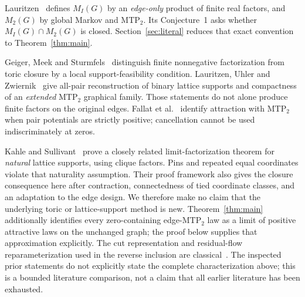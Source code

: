 \documentclass[11pt]{article}
\begin{document}
Lauritzen~\cite[pp.~3125--3126]{Lauritzen2022} defines $M_I(G)$ by an \emph{edge-only} product of finite real factors, and $M_2(G)$ by global Markov and MTP$_2$. Its Conjecture~1 asks whether $M_I(G)\cap M_2(G)$ is closed. Section~\ref{sec:literal} reduces that exact convention to Theorem~\ref{thm:main}.

Geiger, Meek and Sturmfels~\cite[Theorems~3.1--3.2]{GMS2006} distinguish finite nonnegative factorization from toric closure by a local support-feasibility condition. Lauritzen, Uhler and Zwiernik~\cite[Lemma~4.9 and Section~4.4]{LUZ2021} give all-pair reconstruction of binary lattice supports and compactness of an \emph{extended} MTP$_2$ graphical family. Those statements do not alone produce finite factors on the original edges. Fallat et al.~\cite[Theorem~7.5]{Fallat2017} identify attraction with MTP$_2$ when pair potentials are strictly positive; cancellation cannot be used indiscriminately at zeros.

Kahle and Sullivant~\cite[Proposition~4.1, Lemma~5.4 and Theorem~5.5]{KS2024} prove a closely related limit-factorization theorem for \emph{natural} lattice supports, using clique factors. Pins and repeated equal coordinates violate that naturality assumption. Their proof framework also gives the closure consequence here after contraction, connectedness of tied coordinate classes, and an adaptation to the edge design. We therefore make no claim that the underlying toric or lattice-support method is new. Theorem~\ref{thm:main} additionally identifies every zero-containing edge-MTP$_2$ law as a limit of positive attractive laws on the unchanged graph; the proof below supplies that approximation explicitly. The cut representation and residual-flow reparameterization used in the reverse inclusion are classical~\cite{KZ2004,PQ1979,KR2007}. The inspected prior statements do not explicitly state the complete characterization above; this is a bounded literature comparison, not a claim that all earlier literature has been exhausted.
\end{document}
